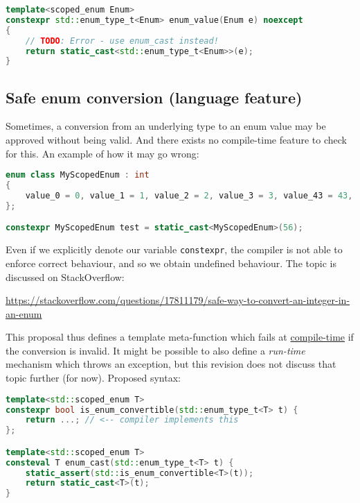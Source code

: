 \documentclass[
  format=manuscript,
  screen=true,
  review=false,
  nonacm=true,
  timestamp=true,
  balance=false]{acmart}
\begin{document}
\begin{lstlisting}[language=Cpp]
template<scoped_enum Enum>
constexpr std::enum_type_t<Enum> enum_value(Enum e) noexcept
{
    // TODO: Error - use enum_cast instead!
    return static_cast<std::enum_type_t<Enum>>(e);
}
\end{lstlisting}


\subsection{Safe enum conversion (language feature)}

Sometimes, a conversion from an underlying type to an enum value may be approved
without being valid. And there exists no compile-time feature to check for this.
An example of how it may go wrong:\vspace{2mm}

\begin{lstlisting}[language=Cpp]
enum class MyScopedEnum : int
{
    value_0 = 0, value_1 = 1, value_2 = 2, value_3 = 3, value_43 = 43, value_57 = 57
};

constexpr MyScopedEnum test = static_cast<MyScopedEnum>(56);
\end{lstlisting}

\noindent
Even if we explicitly denote our variable \texttt{constexpr}, the compiler is not
able to enforce correct behaviour, and so we obtain undefined behaviour. The topic
is discussed on StackOverflow:

\noindent
\url{https://stackoverflow.com/questions/17811179/safe-way-to-convert-an-integer-in-an-enum}

\vspace{3mm}\noindent
This proposal thus defines a template meta-function which fails at
\underline{compile-time} if the conversion is invalid. It might be possible to also
define a \textit{run-time} mechanism which throws an exception, but this revision
does not discuss that topic further (for now). Proposed syntax:\vspace{2mm}

\begin{lstlisting}[language=Cpp]
template<std::scoped_enum T>
constexpr bool is_enum_convertible(std::enum_type_t<T> t) {
    return ...; // <-- compiler implements this
};

template<std::scoped_enum T>
consteval T enum_cast(std::enum_type_t<T> t) {
    static_assert(std::is_enum_convertible<T>(t));
    return static_cast<T>(t);
}
\end{lstlisting}
\end{document}

